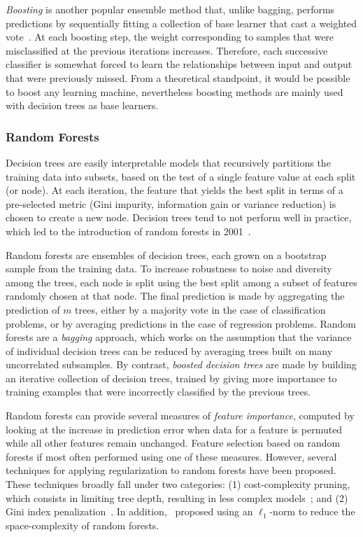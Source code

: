     \textit{Boosting} is another popular ensemble method that, unlike bagging, performs predictions by sequentially fitting a collection of base learner that cast a weighted vote~\citep{hastie2009elements}. At each boosting step, the weight corresponding to samples that were misclassified at the previous iterations increases. Therefore, each successive classifier is somewhat forced to learn the relationships between input and output that were previously missed. From a theoretical standpoint, it would be possible to boost any learning machine, nevertheless boosting methods are mainly used with decision trees as base learners.


    \subsubsection{Random Forests}
    Decision trees are easily interpretable models that recursively partitions the training data into subsets, based on the test of a single feature value at each split (or node). At each iteration, the feature that yields the best split in terms of a pre-selected metric (Gini impurity, information gain or variance reduction) is chosen to create a new node. Decision trees tend to not perform well in practice, which led to the introduction of random forests in 2001~\cite{breiman2001random}.

    Random forests are ensembles of decision trees, each grown on a bootstrap sample from the training data.
    To increase robustness to noise and diversity among the trees, each node is split using the best split among a subset of features randomly chosen at that node.
    The final prediction is made by aggregating the prediction of $m$ trees, either by a majority vote in the case of classification problems, or by averaging predictions in the case of regression problems.
    Random forests are a {\it bagging} approach, which works on the assumption that the variance of individual decision trees can be reduced by averaging trees built on many uncorrelated subsamples.
    By contrast, {\it boosted decision trees} are made by building an iterative collection of decision trees, trained by giving more importance to training examples that were incorrectly classified by the previous trees. 

    Random forests can provide several measures of {\it feature importance}, computed by looking at the increase in prediction error %
    when data for a feature is permuted while all other features remain unchanged. Feature selection based on random forests if most often performed using one of these measures. However, several techniques for applying regularization to random forests have been proposed. These techniques broadly fall under two categories: (1) cost-complexity pruning, which consists in limiting tree depth, resulting in less complex models~\cite{ishwaran2008random,kulkarni2012pruning}; and (2) Gini index penalization~\cite{deng2013gene, liu2014learning}. In addition,~\cite{joly2012ell1} proposed using an $\ell_1$-norm  to reduce the space-complexity of random forests.

